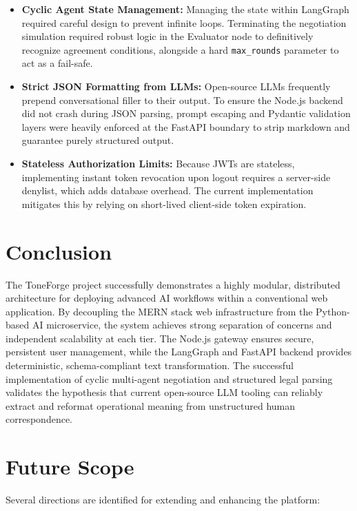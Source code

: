 \documentclass[12pt,a4paper]{report}
\begin{document}
\begin{itemize}
	\item \textbf{Cyclic Agent State Management:} Managing the state within LangGraph required careful design to prevent infinite loops. Terminating the negotiation simulation required robust logic in the Evaluator node to definitively recognize agreement conditions, alongside a hard \texttt{max\_rounds} parameter to act as a fail-safe.
	\item \textbf{Strict JSON Formatting from LLMs:} Open-source LLMs frequently prepend conversational filler to their output. To ensure the Node.js backend did not crash during JSON parsing, prompt escaping and Pydantic validation layers were heavily enforced at the FastAPI boundary to strip markdown and guarantee purely structured output.
	\item \textbf{Stateless Authorization Limits:} Because JWTs are stateless, implementing instant token revocation upon logout requires a server-side denylist, which adds database overhead. The current implementation mitigates this by relying on short-lived client-side token expiration.
\end{itemize}

\section{Conclusion}
The ToneForge project successfully demonstrates a highly modular, distributed architecture for deploying advanced AI workflows within a conventional web application. By decoupling the MERN stack web infrastructure from the Python-based AI microservice, the system achieves strong separation of concerns and independent scalability at each tier. The Node.js gateway ensures secure, persistent user management, while the LangGraph and FastAPI backend provides deterministic, schema-compliant text transformation. The successful implementation of cyclic multi-agent negotiation and structured legal parsing validates the hypothesis that current open-source LLM tooling can reliably extract and reformat operational meaning from unstructured human correspondence.

\section{Future Scope}
Several directions are identified for extending and enhancing the platform:
\end{document}

